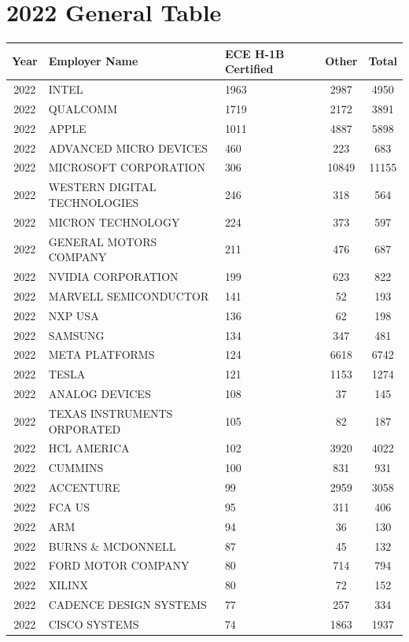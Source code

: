 \documentclass{article}%
\begin{document}
\section{2022 General Table}%
\label{sec:2022GeneralTable}%
\begin{longtable}{c|p{20em}|p{5em}|c|c}%
\hline%
Year&Employer Name&ECE \newline%
 H{-}1B \newline%
 Certified&Other&Total\\%
\hline%
2022&INTEL&1963&2987&4950\\%
\hline%
2022&QUALCOMM&1719&2172&3891\\%
\hline%
2022&APPLE&1011&4887&5898\\%
\hline%
2022&ADVANCED MICRO DEVICES&460&223&683\\%
\hline%
2022&MICROSOFT CORPORATION&306&10849&11155\\%
\hline%
2022&WESTERN DIGITAL TECHNOLOGIES&246&318&564\\%
\hline%
2022&MICRON TECHNOLOGY&224&373&597\\%
\hline%
2022&GENERAL MOTORS COMPANY&211&476&687\\%
\hline%
2022&NVIDIA CORPORATION&199&623&822\\%
\hline%
2022&MARVELL SEMICONDUCTOR&141&52&193\\%
\hline%
2022&NXP USA&136&62&198\\%
\hline%
2022&SAMSUNG&134&347&481\\%
\hline%
2022&META PLATFORMS&124&6618&6742\\%
\hline%
2022&TESLA&121&1153&1274\\%
\hline%
2022&ANALOG DEVICES&108&37&145\\%
\hline%
2022&TEXAS INSTRUMENTS ORPORATED&105&82&187\\%
\hline%
2022&HCL AMERICA&102&3920&4022\\%
\hline%
2022&CUMMINS&100&831&931\\%
\hline%
2022&ACCENTURE&99&2959&3058\\%
\hline%
2022&FCA US&95&311&406\\%
\hline%
2022&ARM&94&36&130\\%
\hline%
2022&BURNS \& MCDONNELL&87&45&132\\%
\hline%
2022&FORD MOTOR COMPANY&80&714&794\\%
\hline%
2022&XILINX&80&72&152\\%
\hline%
2022&CADENCE DESIGN SYSTEMS&77&257&334\\%
\hline%
2022&CISCO SYSTEMS&74&1863&1937\\%

\end{longtable}
\end{document}
